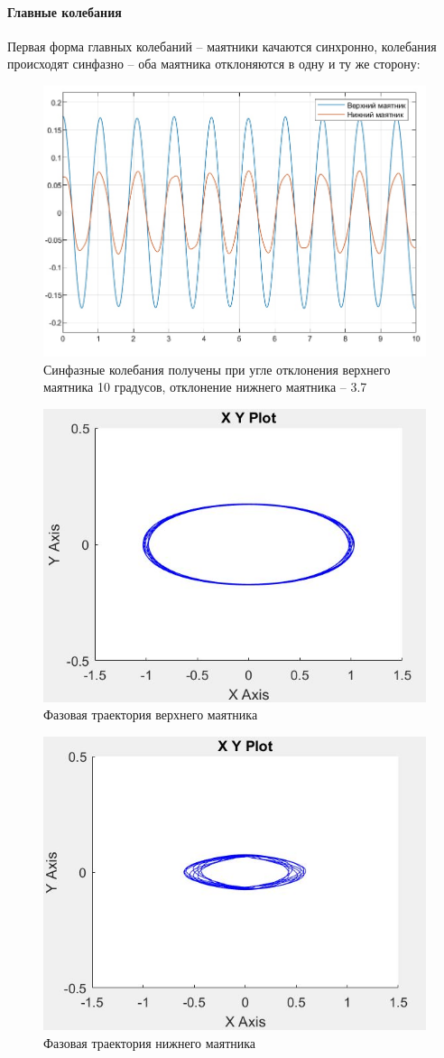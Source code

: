 \documentclass{article}
\begin{document}
	\paragraph*{Главные колебания\\}
	Первая форма главных колебаний -- маятники качаются синхронно, колебания происходят синфазно -- оба маятника отклоняются в одну и ту же сторону:
	\begin{figure}[H]
		\centering
		\includegraphics[width=0.7\linewidth]{sinphase10_37}
		\caption{Синфазные колебания получены при угле отклонения верхнего маятника 10 градусов, отклонение нижнего маятника -- 3.7}
		\label{fig:sinphase103}
	\end{figure}
	\begin{figure}[H]
		\centering
		\includegraphics[width=0.7\linewidth]{sinphase_upper}
		\caption{Фазовая траектория верхнего маятника}
		\label{fig:sinphaseupper}
	\end{figure}
	\begin{figure}[H]
		\centering
		\includegraphics[width=0.7\linewidth]{sinphase_lower}
		\caption{Фазовая траектория нижнего маятника}
		\label{fig:sinphaselower}
	\end{figure}
\end{document}
